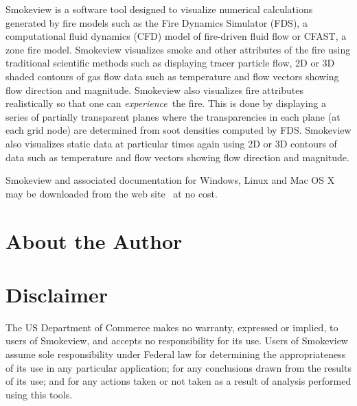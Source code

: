 \documentclass[11pt,twoside]{book}
\begin{document}
Smokeview is a software tool designed to visualize numerical
calculations generated by fire models such as the Fire Dynamics
Simulator (FDS), a computational fluid dynamics (CFD) model of
fire-driven fluid flow or CFAST, a zone fire model. Smokeview
visualizes smoke and other attributes of the fire using
traditional scientific methods such as displaying tracer particle
flow, 2D or 3D shaded contours of gas flow data such as
temperature and flow vectors showing flow direction and magnitude.
Smokeview also visualizes fire attributes realistically so that
one can {\em experience}\ the fire. This is done by displaying a
series of partially transparent planes where the transparencies in
each plane (at each grid node) are determined from soot densities
computed by FDS.  Smokeview also visualizes static data at
particular times again using 2D or 3D contours of data such as
temperature and flow vectors showing flow direction and magnitude.

Smokeview and associated documentation for Windows, Linux and Mac
OS X may be downloaded from the web site {\bf
{}}\ at no cost.


\chapter{About the Author}

\begin{description}
\gforneybio
\end{description}


\chapter{Disclaimer}

The US Department of Commerce makes no warranty,
expressed or implied, to users of Smokeview, and accepts no
responsibility for its use. Users of Smokeview assume sole
responsibility under Federal law for determining the
appropriateness of its use in any particular application; for any
conclusions drawn from the results of its use; and for any actions
taken or not taken as a result of analysis performed using this
tools.
\end{document}
